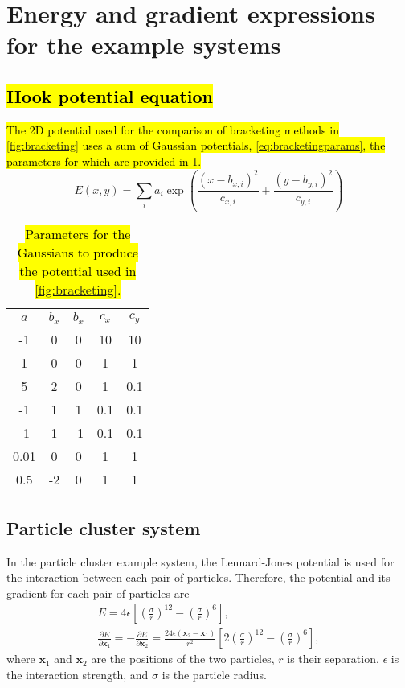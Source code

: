 \documentclass[aip,jcp,reprint,twocolumn]{revtex4-1}
\begin{document}
\section{Energy and gradient expressions for the example systems}
\subsection{\hl{Hook potential equation}}\label{sec:bracketingpotential}
\hl{
The 2D potential used for the comparison of bracketing methods in {\cref{fig:bracketing}} uses a sum of Gaussian potentials, {\cref{eq:bracketingparams}}, the parameters for which are provided in \mbox{\cref{tab:bracketingparams}}.
}
\begin{equation}
  E(x,y) = \sum_i a_i \exp\!\left( \frac{(x-b_{x,i})^2}{c_{x,i}} + \frac{(y-b_{y,i})^2}{c_{y,i}} \right)
  \label{eq:bracketingparams}
\end{equation}
\begin{table}[ht]
  \begin{ruledtabular}
  \begin{tabular}{ccccc}
    $a$  & $b_x$ & $b_x$ & $c_x$ & $c_y$ \\
    \hline
    -1   &   0   &   0   &  10   &  10   \\
     1   &   0   &   0   &   1   &   1   \\
     5   &   2   &   0   &   1   &  0.1  \\
    -1   &   1   &   1   &  0.1  &  0.1  \\
    -1   &   1   &  -1   &  0.1  &  0.1  \\
    0.01 &   0   &   0   &   1   &   1   \\
    0.5  &  -2   &   0   &   1   &   1   \\
  \end{tabular}
  \end{ruledtabular}
  \caption{\label{tab:bracketingparams}
  \hl{
    Parameters for the Gaussians to produce the potential used in {\cref{fig:bracketing}}.
  }
  }
\end{table}

\subsection{Particle cluster system}
In the particle cluster example system, the Lennard-Jones potential is used for the interaction between each pair of particles.
Therefore, the potential and its gradient for each pair of particles are
\begin{gather}
  E = 4\epsilon \left[ \left(\frac{\sigma}{r}\right)^{12} - \left(\frac{\sigma}{r}\right)^6 \right], \\
  \frac{\partial E}{\partial \bm{x}_1} = -\frac{\partial E}{\partial \bm{x}_2} =
    \frac{24 \epsilon (\bm{x}_2 - \bm{x}_1)}{r^2} \left[ 2 \left(\frac{\sigma}{r}\right)^{12} - \left(\frac{\sigma}{r}\right)^6 \right],
\end{gather}
where $\bm{x}_1$ and $\bm{x}_2$ are the positions of the two particles, $r$ is their separation, $\epsilon$ is the interaction strength, and $\sigma$ is the particle radius.
\end{document}
